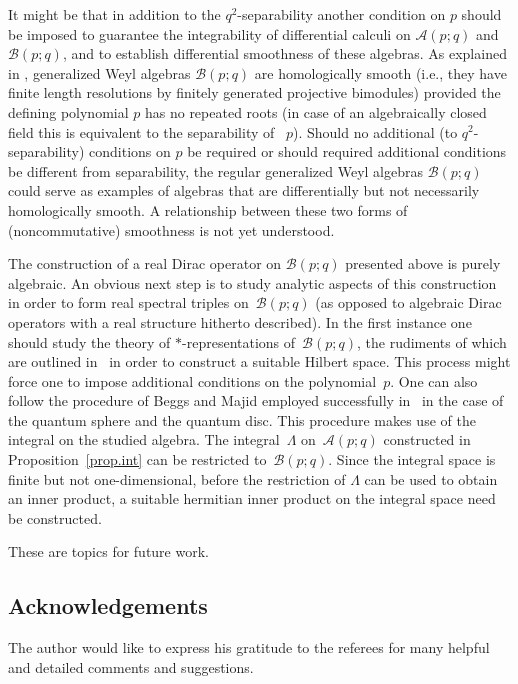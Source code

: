 \documentclass[pdftex]{sigma}
\numberwithin{equation}{section}
\def\Weyl#1#2{{\mathcal{B}}(#1;#2)}
\def\AWeyl#1#2{{\mathcal{A}}(#1;#2)}
\begin{document}
It might be that in addition to the $q^2$-separability another condition on $p$ should be imposed to guarantee the integrability of dif\/ferential calculi on $\AWeyl p q$ and $\Weyl p q$, and to establish dif\/ferential smoothness of these algebras. As explained in \cite{Liu:hom}, generalized Weyl algebras $\Weyl p q$ are homologically smooth (i.e., they have f\/inite length resolutions by f\/initely generated projective bimodules) provided the def\/ining polynomial $p$ has no repeated roots (in case of an algebraically closed f\/ield this is equivalent to the separability of ~$p$). Should no additional (to $q^2$-separability) conditions on $p$ be required or should required additional conditions be dif\/ferent from separability, the regular generalized Weyl algebras $\Weyl p q$ could serve as examples of algebras that are dif\/ferentially but not necessarily homologically smooth. A relationship between these two forms of (noncommutative) smoothness is not yet understood.

The construction of a real Dirac operator on $\Weyl p q$ presented above is purely algebraic. An obvious next step is to study analytic aspects of this construction in order to form real spectral triples on~$\Weyl p q$ (as opposed to algebraic Dirac operators with a real structure hitherto described). In the f\/irst instance one should study the theory of $*$-representations of~$\Weyl p q$, the rudiments of which are outlined in~\cite{Brz:gen} in order to construct a suitable Hilbert space. This process might force one to impose additional conditions on the polynomial~$p$. One can also follow the procedure of Beggs and Majid employed successfully in~\cite{BegMaj:spe} in the case of the quantum sphere and the quantum disc. This procedure makes use of the integral on the studied algebra. The integral~$\Lambda$ on~$\AWeyl p q$ constructed in Proposition~\ref{prop.int} can be restricted to~$\Weyl p q$. Since the integral space is f\/inite but not one-dimensional, before the restriction of $\Lambda$ can be used to obtain an inner product, a suitable hermitian inner product on the integral space need be constructed.

These are topics for future work.

\subsection*{Acknowledgements}
The author would like to express his gratitude to the referees for many helpful and detailed comments and suggestions.
\end{document}
